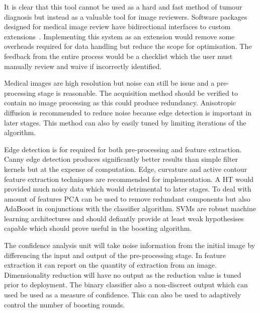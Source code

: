 \documentclass[journal]{IEEEtran}
\begin{document}
It is clear that this tool cannot be used as a hard and fast method of tumour diagnosis but instead as a valuable tool for image reviewers.
Software packages designed for medical image review have bidirectional interfaces to custom extensions~\cite{slicer}.
Implementing this system as an extension would remove some overheads required for data handling but reduce the scope for optimisation.
The feedback from the entire process would be a checklist which the user must manually review and waive if incorrectly identified.

Medical images are high resolution but noise can still be issue and a pre-processing stage is reasonable.
The acquisition method should be verified to contain no image processing as this could produce redundancy.
Anisotropic diffusion is recommended to reduce noise because edge detection is important in later stages.
This method can also by easily tuned by limiting iterations of the algorithm.

Edge detection is for required for both pre-processing and feature extraction.
Canny edge detection produces significantly better results than simple filter kernels but at the expense of computation.
Edge, curvature and active contour feature extraction techniques are recommended for implementation.
A HT would provided much noisy data which would detrimental to later stages.
To deal with amount of features PCA can be used to remove redundant components but also AdaBoost in conjunctions with the classifier algorithm.
SVMs are robust machine learning architectures and should defiantly provide at least weak hypothesises capable which should prove useful in the boosting algorithm. 


The confidence analysis unit will take noise information from the initial image by differencing the input and output of the pre-processing stage.
In feature extraction it can report on the quantity of extraction from an image. 
Dimensionality reduction will have no output as the reduction value is tuned prior to deployment.
The binary classifier also a non-discreet output which can used be used as a measure of confidence.
This can also be used to adaptively control the number of boosting rounds.









\end{document}
